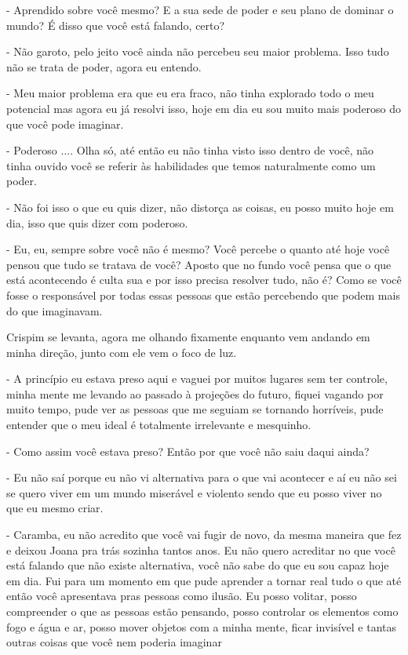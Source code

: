 - Aprendido sobre você mesmo? E a sua sede de poder e seu plano de dominar o mundo? É disso que você está falando, certo?

- Não garoto, pelo jeito você ainda não percebeu seu maior problema. Isso tudo não se trata de poder, agora eu entendo. 

- Meu maior problema era que eu era fraco, não tinha explorado todo o meu potencial mas agora eu já resolvi isso, hoje em dia eu sou muito mais poderoso do que você pode imaginar.

- Poderoso .... Olha só, até então eu não tinha visto isso dentro de você, não tinha ouvido você se referir às habilidades que temos naturalmente como um poder.

- Não foi isso o que eu quis dizer, não distorça as coisas, eu posso muito hoje em dia, isso que quis dizer com poderoso.

- Eu, eu, sempre sobre você não é mesmo? Você percebe o quanto até hoje você pensou que tudo se tratava de você? Aposto que no fundo você pensa que o que está acontecendo é culta sua e por isso precisa resolver tudo, não é? Como se você fosse o responsável por todas essas pessoas que estão percebendo que podem mais do que imaginavam.


Crispim se levanta, agora me olhando fixamente enquanto vem andando em minha direção, junto com ele vem o foco de luz.

- A princípio eu estava preso aqui e vaguei por muitos lugares sem ter controle, minha mente me levando ao passado à projeções do futuro, fiquei vagando por muito tempo, pude ver as pessoas que me seguiam se tornando horríveis, pude entender que o meu ideal é totalmente irrelevante e mesquinho.

- Como assim você estava preso? Então por que você não saiu daqui ainda?

- Eu não saí porque eu não vi alternativa para o que vai acontecer e aí eu não sei se quero viver em um mundo miserável e violento sendo que eu posso viver no que eu mesmo criar.

- Caramba, eu não acredito que você vai fugir de novo, da mesma maneira que fez e deixou Joana pra trás sozinha tantos anos. Eu não quero acreditar no que você está falando que não existe alternativa, você não sabe do que eu sou capaz hoje em dia. Fui para um momento em que pude aprender a tornar real tudo o que até então você apresentava pras pessoas como ilusão. Eu posso volitar, posso compreender o que as pessoas estão pensando, posso controlar os elementos como fogo e água e ar, posso mover objetos com a minha mente, ficar invisível e tantas outras coisas que você nem poderia imaginar

